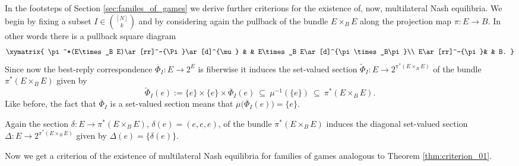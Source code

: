 \documentclass[a4paper,11pt,reqno,english]{amsart}
\theoremstyle{plain}
\theoremstyle{definition}
\begin{document}
\medskip
In the footsteps of Section \ref{sec:familes_of_games} we derive further criterions for the existence of, now, multilateral Nash equilibria.
We begin by fixing a subset $I\in\binom{[N]}{k}$ and by considering again the pullback of the bundle $E\times_B E$ along the projection map $\pi\colon E\longrightarrow B$.
In other words there is a pullback square diagram
\begin{equation}\label{eq:pull-back-02}
	\xymatrix{
	\pi^*(E\times_B E)\ar[rr]^-{\Pi}\ar[d]^{\mu} & & E\times_B E\ar[d]^{\pi\times_B\pi}\\
	E\ar[rr]^-{\pi}& & B.
	}
\end{equation}
Since now the best-reply correspondence $\overline{\Phi}_I \colon E \longrightarrow 2^{E}$ is fiberwise it induces the set-valued section $\widetilde{\Phi}_I\colon E\longrightarrow 2^{\pi^*(E\times_B E)}$ of the bundle $\pi^*(E\times_B E)$ given by
\begin{displaymath}
	\widetilde{\Phi}_I (e):= \{e\}\times\{e\}\times  \overline{\Phi}_I(e) \ \subseteq \ \mu^{-1}(\{e\})  \ \subseteq \ \pi^*(E\times_B E).
\end{displaymath}
Like before, the fact that $\overline{\Phi}_I$ is a set-valued section means that $\mu\big(\overline{\Phi}_I (e)\big)=\{e\}$.


\medskip
Again the section $\delta\colon E\longrightarrow \pi^*(E\times_B E)$, $\delta(e)=(e,e,e)$, of the bundle $\pi^*(E\times_B E)$  induces the diagonal set-valued section $\Delta\colon E\longrightarrow 2^{\pi^*(E\times_B E)}$ given by $\Delta(e)=\{\delta(e)\}$.


\medskip
Now we get a criterion of the existence of multilateral Nash equilibria for families of games analogous to Theorem \ref{thm:criterion_01}.
\end{document}
